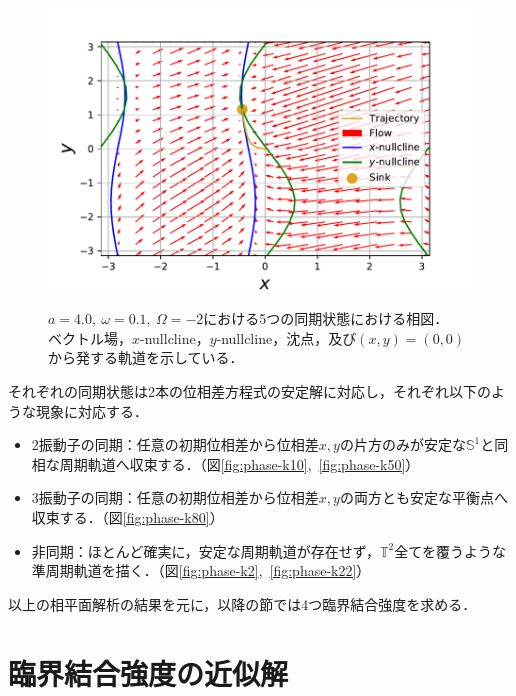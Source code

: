\documentclass[../main]{subfiles}
\begin{document}
\begin{figure}[tbp]
\begin{minipage}[b]{0.47\linewidth}
      \includegraphics[keepaspectratio, scale=0.42]{images/phase_a4K80.pdf}
      \label{fig:phase-k80}
    \end{minipage}
    \caption{$a=4.0,\ \omega=0.1,\ \Omega=-2$における5つの同期状態における相図．\\
    ベクトル場，$x$-nullcline，$y$-nullcline，沈点，及び$(x,y)=(0,0)$から発する軌道を示している．}\label{fig:phase}
\end{figure}

それぞれの同期状態は2本の位相差方程式の安定解に対応し，それぞれ以下のような現象に対応する．
\begin{itemize}
    \item 
    2振動子の同期：任意の初期位相差から位相差$x,y$の片方のみが安定な$\mathbb{S}^1$と同相な周期軌道へ収束する．（図\ref{fig:phase-k10},\ \ref{fig:phase-k50}）
    \item
    3振動子の同期：任意の初期位相差から位相差$x,y$の両方とも安定な平衡点へ収束する．（図\ref{fig:phase-k80}）
    \item
    非同期：ほとんど確実に，安定な周期軌道が存在せず，$\mathbb{T}^2$全てを覆うような準周期軌道を描く．（図\ref{fig:phase-k2},\ \ref{fig:phase-k22}）
\end{itemize}
以上の相平面解析の結果を元に，以降の節では4つ臨界結合強度を求める．
\section{臨界結合強度の近似解}
\label{sec:3body-critical}
\end{document}
